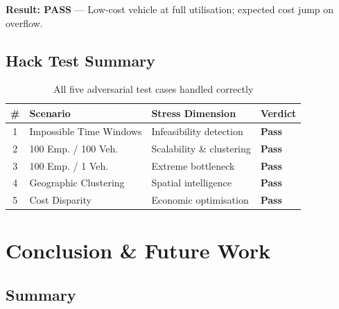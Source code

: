 \documentclass[11pt,a4paper]{article}
\begin{document}
\begin{resultbox}
\textbf{Result: \textcolor{velgreen}{PASS}} --- Low-cost vehicle at full utilisation; expected cost jump on overflow.
\end{resultbox}

\subsection{Hack Test Summary}

\begin{table}[H]
\centering
\caption{All five adversarial test cases handled correctly}
\label{tab:hack-summary}
\small
\begin{tabular}{clll}
\toprule
\textbf{\#} & \textbf{Scenario} & \textbf{Stress Dimension} & \textbf{Verdict} \\
\midrule
\rowcolor{rowalt}
1 & Impossible Time Windows & Infeasibility detection & \textcolor{velgreen}{\textbf{Pass}} \\
2 & 100 Emp. / 100 Veh. & Scalability \& clustering & \textcolor{velgreen}{\textbf{Pass}} \\
\rowcolor{rowalt}
3 & 100 Emp. / 1 Veh. & Extreme bottleneck & \textcolor{velgreen}{\textbf{Pass}} \\
4 & Geographic Clustering & Spatial intelligence & \textcolor{velgreen}{\textbf{Pass}} \\
\rowcolor{rowalt}
5 & Cost Disparity & Economic optimisation & \textcolor{velgreen}{\textbf{Pass}} \\
\bottomrule
\end{tabular}
\end{table}

\section{Conclusion \& Future Work}

\subsection{Summary}
\end{document}
